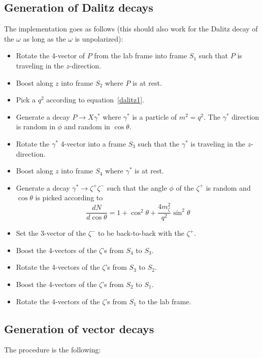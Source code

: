 \documentclass[12pt]{article}
\begin{document}
\subsection{Generation of Dalitz decays}
The implementation goes as follows (this should also work for the Dalitz
decay of the $\omega$ as long as the $\omega$ is unpolarized):
\begin{itemize}
\item Rotate the 4-vector of $P$ from the lab frame into frame
  $S_1$ such that $P$ is traveling in the $z$-direction.
\item Boost along $z$ into frame $S_2$ where $P$ is at rest.
\item Pick a $q^2$ according to equation~\ref{dalitz1}.
\item Generate a decay $P \to X \gamma^*$ where $\gamma^*$ is
  a particle of $m^2 = q^2$.  The $\gamma^*$ direction is random
  in $\phi$ and random in $\cos \theta$.
\item Rotate the $\gamma^*$ 4-vector into a frame $S_3$ 
  such that the $\gamma^*$ is traveling in the $z$-direction.
\item Boost along $z$ into frame $S_4$ where $\gamma^*$ is at rest.
\item Generate a decay $\gamma^* \to \zeta^+ \zeta^-$ such that
  the angle $\phi$ of the $\zeta^+$ is random and
  $\cos \theta$ is picked according to~\cite{adlarson}
  \begin{equation}
    \frac{dN}{d \cos \theta} = 1 + \cos^2\theta + \frac{4 m^2_\zeta}{q^2} \sin^2\theta
    \label{dalitzAngles}
  \end{equation}
\item  Set the 3-vector of the $\zeta^-$ to be back-to-back with the $\zeta^+$.
\item Boost the 4-vectors of the $\zeta$'s from $S_4$ to $S_3$.
\item Rotate the 4-vectors of the $\zeta$'s from $S_3$ to $S_2$.
\item Boost the 4-vectors of the $\zeta$'s from $S_2$ to $S_1$.
\item Rotate the 4-vectors of the $\zeta$'s from $S_1$ to the lab frame.
\end{itemize}

\subsection{Generation of vector decays}

The procedure is the following:
\end{document}
